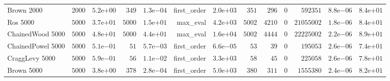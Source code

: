 \begin{longtable}[c]{lrrrrrrrrrrrr}
Brown 2000 & \( 2000\) & \( 5.2\)e\(+00\) & \(  349\) & \( 1.3\)e\(-04\) & first\_order & \( 2.0\)e\(+03\) & \(  351\) & \(  296\) & \(    0\) & \(592351\) & \( 8.8\)e\(-06\) & \( 8.4\)e\(+01\) \\
Ros 5000 & \( 5000\) & \( 3.7\)e\(+01\) & \( 5000\) & \( 1.5\)e\(+01\) & max\_eval & \( 4.2\)e\(+03\) & \( 5002\) & \( 4210\) & \(    0\) & \(21055002\) & \( 1.8\)e\(-06\) & \( 8.4\)e\(+01\) \\
ChainedWood 5000 & \( 5000\) & \( 4.8\)e\(+01\) & \( 5000\) & \( 4.4\)e\(+01\) & max\_eval & \( 1.6\)e\(+04\) & \( 5002\) & \( 4444\) & \(    0\) & \(22225002\) & \( 2.2\)e\(-06\) & \( 8.9\)e\(+01\) \\
ChainedPowel 5000 & \( 5000\) & \( 5.1\)e\(-01\) & \(   51\) & \( 5.7\)e\(-03\) & first\_order & \( 6.6\)e\(-05\) & \(   53\) & \(   39\) & \(    0\) & \(195053\) & \( 2.6\)e\(-06\) & \( 7.4\)e\(+01\) \\
CraggLevy 5000 & \( 5000\) & \( 5.9\)e\(-01\) & \(   56\) & \( 1.1\)e\(-02\) & first\_order & \( 3.3\)e\(+03\) & \(   58\) & \(   45\) & \(    0\) & \(225058\) & \( 2.6\)e\(-06\) & \( 7.8\)e\(+01\) \\
Brown 5000 & \( 5000\) & \( 3.8\)e\(+00\) & \(  378\) & \( 2.8\)e\(-04\) & first\_order & \( 5.0\)e\(+03\) & \(  380\) & \(  311\) & \(    0\) & \(1555380\) & \( 2.4\)e\(-06\) & \( 8.2\)e\(+01\) \\
\hline 
\end{longtable}



